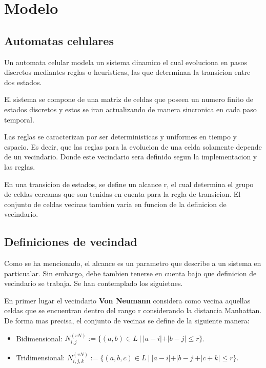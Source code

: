 \section{Modelo}\label{sec:modelo}

\subsection{Automatas celulares}\label{subsec:automatas-celulares}

Un automata celular modela un sistema dinamico el cual evoluciona en pasos discretos mediantes reglas o heuristicas,
las que determinan la transicion entre dos estados.

El sistema se compone de una matriz de celdas que poseen un numero finito de estados discretos y estos se iran actualizando
de manera sincronica en cada paso temporal.

Las reglas se caracterizan por ser deterministicas y uniformes en tiempo y espacio. Es decir, que las reglas para la evolucion
de una celda solamente depende de un vecindario. Donde este vecindario sera definido segun la implementacion y las reglas.

En una transicion de estados, se define un alcance r, el cual determina el grupo de celdas cercanas que son tenidas
en cuenta para la regla de transicion. El conjunto de celdas vecinas tambien varia en funcion de la definicion de vecindario.

\subsection{Definiciones de vecindad}\label{subsec:definiciones-de-vecindad}
Como se ha mencionado, el alcance es un parametro que describe a un sistema en particualar. Sin embargo, debe tambien
tenerse en cuenta bajo que definicion de vecindario se trabaja. Se han contemplado los siguietnes.

En primer lugar el vecindario \textbf{Von Neumann} considera como vecina aquellas celdas que se encuentran dentro del rango r
considerando la distancia Manhattan. De forma mas precisa, el conjunto de vecinas se define de la siguiente manera:
\begin{itemize}
    \item Bidimensional: $N_{i,j}^{(vN)}:=\{(a,b) \in L\ |\ |a - i| + |b - j| \leq r\}$.
    \item Tridimensional: $N_{i,j, k}^{(vN)}:=\{(a,b,c) \in L\ |\ |a-i| + |b - j| + |c + k| \leq r\}$.
\end{itemize}


